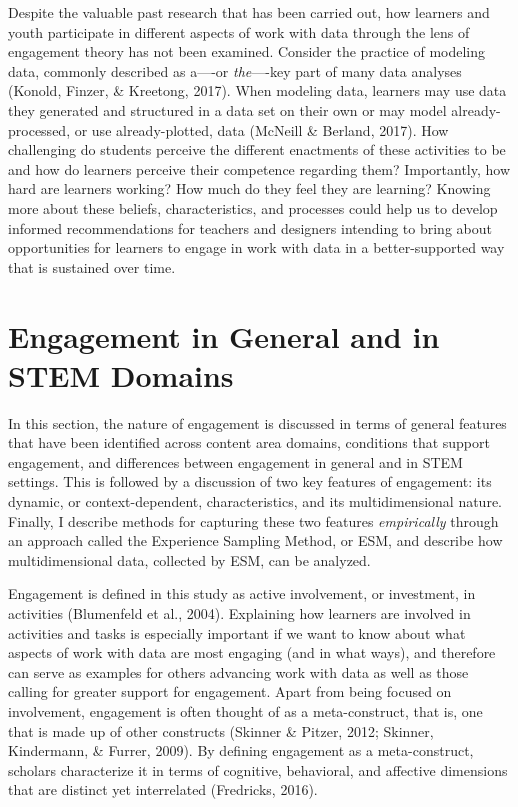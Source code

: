 \documentclass[]{book}
\theoremstyle{definition}
\theoremstyle{definition}
\theoremstyle{definition}
\theoremstyle{remark}
\begin{document}
Despite the valuable past research that has been carried out, how
learners and youth participate in different aspects of work with data
through the lens of engagement theory has not been examined. Consider
the practice of modeling data, commonly described as a----or
\emph{the}----key part of many data analyses (Konold, Finzer, \&
Kreetong, 2017). When modeling data, learners may use data they
generated and structured in a data set on their own or may model
already-processed, or use already-plotted, data (McNeill \& Berland,
2017). How challenging do students perceive the different enactments of
these activities to be and how do learners perceive their competence
regarding them? Importantly, how hard are learners working? How much do
they feel they are learning? Knowing more about these beliefs,
characteristics, and processes could help us to develop informed
recommendations for teachers and designers intending to bring about
opportunities for learners to engage in work with data in a
better-supported way that is sustained over time.

\section{Engagement in General and in STEM
Domains}\label{engagement-in-general-and-in-stem-domains}

In this section, the nature of engagement is discussed in terms of
general features that have been identified across content area domains,
conditions that support engagement, and differences between engagement
in general and in STEM settings. This is followed by a discussion of two
key features of engagement: its dynamic, or context-dependent,
characteristics, and its multidimensional nature. Finally, I describe
methods for capturing these two features \emph{empirically} through an
approach called the Experience Sampling Method, or ESM, and describe how
multidimensional data, collected by ESM, can be analyzed.

Engagement is defined in this study as active involvement, or
investment, in activities (Blumenfeld et al., 2004). Explaining how
learners are involved in activities and tasks is especially important if
we want to know about what aspects of work with data are most engaging
(and in what ways), and therefore can serve as examples for others
advancing work with data as well as those calling for greater support
for engagement. Apart from being focused on involvement, engagement is
often thought of as a meta-construct, that is, one that is made up of
other constructs (Skinner \& Pitzer, 2012; Skinner, Kindermann, \&
Furrer, 2009). By defining engagement as a meta-construct, scholars
characterize it in terms of cognitive, behavioral, and affective
dimensions that are distinct yet interrelated (Fredricks, 2016).
\end{document}

